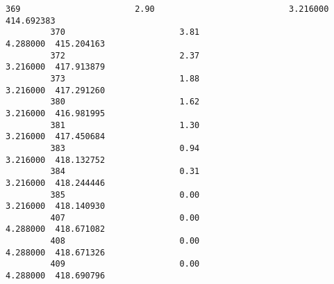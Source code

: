 \documentclass[11pt]{article}
\begin{document}
\begin{Verbatim}[commandchars=\\\{\}]
         369                       2.90                           3.216000  414.692383   
         370                       3.81                           4.288000  415.204163   
         372                       2.37                           3.216000  417.913879   
         373                       1.88                           3.216000  417.291260   
         380                       1.62                           3.216000  416.981995   
         381                       1.30                           3.216000  417.450684   
         383                       0.94                           3.216000  418.132752   
         384                       0.31                           3.216000  418.244446   
         385                       0.00                           3.216000  418.140930   
         407                       0.00                           4.288000  418.671082   
         408                       0.00                           4.288000  418.671326   
         409                       0.00                           4.288000  418.690796   
         

\end{Verbatim}
\end{document}
